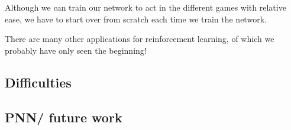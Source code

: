 \documentclass{article}
\begin{document}
Although we can train our network to act in the different games with relative ease, we have to start over from scratch each time we train the network.

There are many other applications for reinforcement learning, of which we probably have only seen the beginning!

\subsection{Difficulties}
\subsection{PNN/ future work}
\cite{*}


\end{document}
